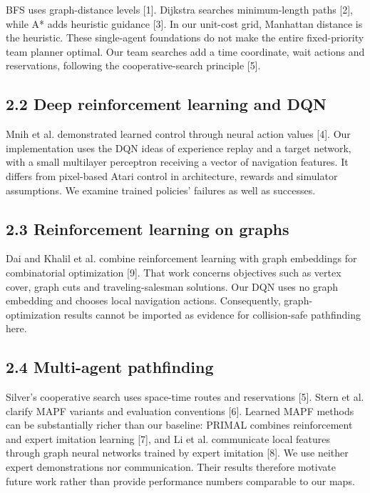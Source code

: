 \documentclass[10pt,a4paper]{article}
\begin{document}
BFS uses graph-distance levels [1]. Dijkstra searches minimum-length paths [2],
while A* adds heuristic guidance [3]. In our unit-cost grid, Manhattan distance
is the heuristic. These single-agent foundations do not make the entire
fixed-priority team planner optimal. Our team searches add a time coordinate,
wait actions and reservations, following the cooperative-search principle [5].

\subsection*{2.2 Deep reinforcement learning and DQN}

Mnih et al. demonstrated learned control through neural action values [4]. Our
implementation uses the DQN ideas of experience replay and a target network,
with a small multilayer perceptron receiving a vector of navigation features.
It differs from pixel-based Atari control in architecture, rewards and simulator
assumptions. We examine trained policies' failures as well as successes.

\subsection*{2.3 Reinforcement learning on graphs}

Dai and Khalil et al. combine reinforcement learning with graph embeddings for
combinatorial optimization [9]. That work concerns objectives such as vertex
cover, graph cuts and traveling-salesman solutions. Our DQN uses no graph
embedding and chooses local navigation actions. Consequently, graph-optimization
results cannot be imported as evidence for collision-safe pathfinding here.

\subsection*{2.4 Multi-agent pathfinding}

Silver's cooperative search uses space-time routes and reservations [5]. Stern
et al. clarify MAPF variants and evaluation conventions [6]. Learned MAPF methods
can be substantially richer than our baseline: PRIMAL combines reinforcement
and expert imitation learning [7], and Li et al. communicate local features
through graph neural networks trained by expert imitation [8]. We use neither
expert demonstrations nor communication. Their results therefore motivate
future work rather than provide performance numbers comparable to our maps.
\end{document}
